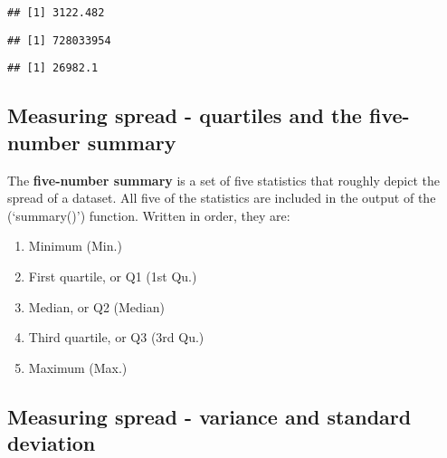 \documentclass[
]{article}
\newenvironment{Shaded}{\begin{snugshade}}{\end{snugshade}}
\newcommand{\FunctionTok}[1]{\textcolor[rgb]{0.94,0.94,0.56}{#1}}
\newcommand{\NormalTok}[1]{\textcolor[rgb]{0.80,0.80,0.80}{#1}}
\newcommand{\SpecialCharTok}[1]{\textcolor[rgb]{0.86,0.64,0.64}{#1}}
\providecommand{\tightlist}{%
  \setlength{\itemsep}{0pt}\setlength{\parskip}{0pt}}
\begin{document}
\begin{verbatim}
## [1] 3122.482
\end{verbatim}

\begin{Shaded}
\end{Shaded}

\begin{verbatim}
## [1] 728033954
\end{verbatim}

\begin{Shaded}
\end{Shaded}

\begin{verbatim}
## [1] 26982.1
\end{verbatim}

\hypertarget{measuring-spread---quartiles-and-the-five-number-summary}{%
\subsection{Measuring spread - quartiles and the five-number
summary}\label{measuring-spread---quartiles-and-the-five-number-summary}}

The \textbf{five-number summary} is a set of five statistics that
roughly depict the spread of a dataset. All five of the statistics are
included in the output of the (`summary()') function. Written in order,
they are:

\begin{enumerate}
\def\labelenumi{\arabic{enumi}.}
\tightlist
\item
  Minimum (Min.)
\item
  First quartile, or Q1 (1st Qu.)
\item
  Median, or Q2 (Median)
\item
  Third quartile, or Q3 (3rd Qu.)
\item
  Maximum (Max.)
\end{enumerate}

\hypertarget{measuring-spread---variance-and-standard-deviation}{%
\subsection{Measuring spread - variance and standard
deviation}\label{measuring-spread---variance-and-standard-deviation}}
\end{document}
